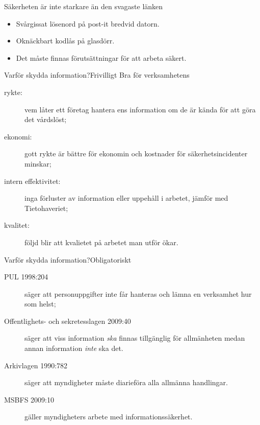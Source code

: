 \documentclass{beamer}
\begin{document}
\begin{frame}{Säkerheten är inte starkare än den svagaste länken}
  \begin{itemize}
    \item Svårgissat lösenord på post-it bredvid datorn.
    \item Oknäckbart kodlås på glasdörr.
    \item Det måste finnas förutsättningar för att arbeta säkert.
  \end{itemize}
\end{frame}

\begin{frame}{Varför skydda information?}{Frivilligt}
  Bra för verksamhetens
  \begin{description}
    \item[rykte:] vem låter ett företag hantera ens information om de är kända 
      för att göra det vårdslöst;

    \item[ekonomi:] gott rykte är bättre för ekonomin och kostnader för 
      säkerhetsincidenter minskar;

    \item[intern effektivitet:] inga förluster av information eller uppehåll 
      i arbetet, jämför med Tietohaveriet;

    \item[kvalitet:] följd blir att kvalietet på arbetet man utför ökar.

  \end{description}
\end{frame}

\begin{frame}{Varför skydda information?}{Obligatoriskt}
  \begin{description}
    \item[PUL 1998:204] säger att personuppgifter inte får hanteras och lämna 
      en verksamhet hur som helst;

    \item[Offentlighets- och sekretesslagen 2009:40] säger att viss information 
      \emph{ska} finnas tillgänglig för allmänheten medan annan information 
      \emph{inte} ska det.

    \item[Arkivlagen 1990:782] säger att myndigheter måste diarieföra alla 
      allmänna handlingar.

    \item[MSBFS 2009:10] gäller myndigheters arbete med informationssäkerhet.

  \end{description}
\end{frame}
\end{document}
